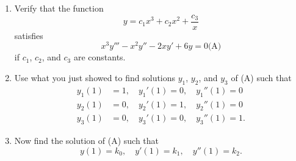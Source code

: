 \documentclass{ximera}
\begin{document}
\begin{problem}\label{exer:9.1.5}
\begin{enumerate}
\item %
Verify that the function
$$
y=c_1x^3+c_2x^2+\frac{c_3}{x}
$$
satisfies
$$
x^3 y'''-x^2y''-2xy'+6y=0
\text{(A)}
$$
if $c_1$, $c_2$, and $c_3$ are constants.

\item %
Use what you just showed to find solutions $y_1$, $y_2$, and $y_3$ of
(A) such that
$$
\begin{array}{rl}
y_1(1)&=1,\quad y_1'(1)=0,\quad  y_1''(1)=0  \\ 
y_2(1)&=0,\quad  y_2'(1)=1,\quad  y_2''(1)=0  \\ 
y_3(1)&=0,\quad  y_3'(1)=0,\quad  y_3''(1)=1.
\end{array}
$$


\item %
Now find the solution of (A) such that
$$
y(1)=k_0,\quad y'(1)=k_1,\quad   y''(1)=k_2.
$$
\end{enumerate}
\end{problem}
\end{document}
